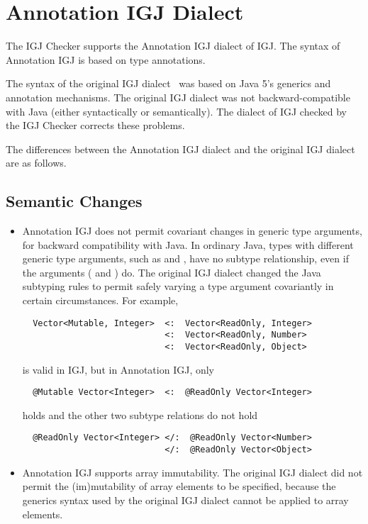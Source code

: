 \section{Annotation IGJ Dialect\label{annotation-igj-dialect}}

The IGJ Checker supports the Annotation IGJ dialect of IGJ\@.  The syntax of
Annotation IGJ is based on type annotations.

The syntax of the original IGJ
dialect~\cite{ZibinPAAKE2007} was based on Java 5's generics and annotation mechanisms. The original
IGJ dialect was not backward-compatible with Java (either syntactically or
semantically). The dialect of IGJ checked by the IGJ Checker corrects these
problems.

The differences between the Annotation IGJ dialect and the original IGJ dialect
are as follows.

\subsection{Semantic Changes}

\begin{itemize}

\item
  Annotation IGJ does not permit covariant changes in generic type
  arguments, for backward compatibility with Java.  In ordinary Java, types
  with different generic type arguments, such as  and
  , have no subtype relationship, even if the
  arguments ( and ) do. The original IGJ dialect
  changed the Java subtyping rules to permit safely varying a type argument
  covariantly in certain circumstances. For example,

\begin{Verbatim}
  Vector<Mutable, Integer>  <:  Vector<ReadOnly, Integer>
                            <:  Vector<ReadOnly, Number>
                            <:  Vector<ReadOnly, Object>
\end{Verbatim}

is valid in IGJ, but in Annotation IGJ, only

\begin{Verbatim}
  @Mutable Vector<Integer>  <:  @ReadOnly Vector<Integer>
\end{Verbatim}

holds and the other two subtype relations do not hold

\begin{Verbatim}
  @ReadOnly Vector<Integer> </:  @ReadOnly Vector<Number>
                            </:  @ReadOnly Vector<Object>
\end{Verbatim}


\item
  Annotation IGJ supports array immutability. The original IGJ dialect did
  not permit the (im)mutability of array elements to be specified, because
  the generics syntax used by the original IGJ dialect cannot be applied to
  array elements.

\end{itemize}

